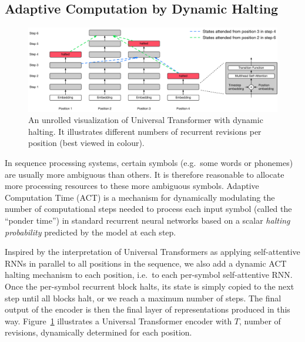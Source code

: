\subsection{Adaptive Computation by Dynamic Halting}
\label{sec:dynamic-halting}
\begin{figure}
 \centering
 \includegraphics[width=1.0\textwidth]{04-part-03/chapter-06/figs_and_tables/fig_adaptive-universal-transformer.pdf}
 \caption{An unrolled visualization of Universal Transformer with dynamic halting. It illustrates different numbers of recurrent revisions per position (best viewed in colour).}
 \label{fig:adaptive_ut}
\end{figure}
In sequence processing systems, certain symbols (e.g.\ some words or phonemes) are usually more ambiguous than others. It is therefore reasonable to allocate more processing resources to these more ambiguous symbols. Adaptive Computation Time (ACT) \citep{graves2016adaptive} is a mechanism for dynamically modulating the number of computational steps needed to process each input symbol (called the ``ponder time'') in standard recurrent neural networks based on a scalar \emph{halting probability} predicted by the model at each step.

Inspired by the interpretation of Universal Transformers as applying self-attentive RNNs in parallel to all positions in the sequence, we also add a dynamic ACT halting mechanism to each position, i.e.\ to each per-symbol self-attentive RNN. Once the per-symbol recurrent block halts, its state is simply copied to the next step until all blocks halt, or we reach a maximum number of steps. The final output of the encoder is then the final layer of representations produced in this way. Figure~\ref{fig:adaptive_ut} illustrates a Universal Transformer encoder with $T$, number of revisions, dynamically determined for each position.


